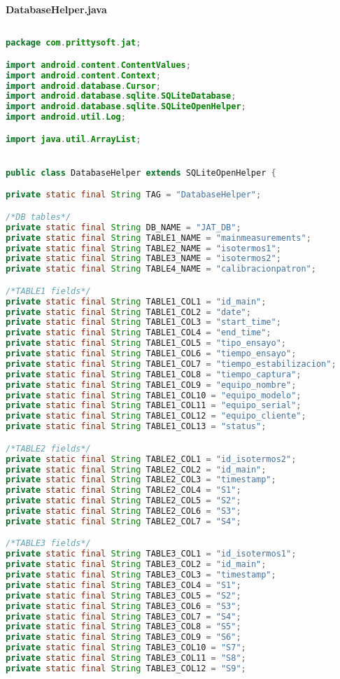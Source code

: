 \pagestyle{plain}
\centering\textbf{DatabaseHelper.java}

\begin{lstlisting}[language=java, caption={Clase DatabaseHelper, crea la base de datos de no existir y contiene las consultas e inserciones a la misma}, captionpos=b, basicstyle=\small]

package com.prittysoft.jat;

import android.content.ContentValues;
import android.content.Context;
import android.database.Cursor;
import android.database.sqlite.SQLiteDatabase;
import android.database.sqlite.SQLiteOpenHelper;
import android.util.Log;

import java.util.ArrayList;


public class DatabaseHelper extends SQLiteOpenHelper {

private static final String TAG = "DatabaseHelper";

/*DB tables*/
private static final String DB_NAME = "JAT_DB";
private static final String TABLE1_NAME = "mainmeasurements";
private static final String TABLE2_NAME = "isotermos1";
private static final String TABLE3_NAME = "isotermos2";
private static final String TABLE4_NAME = "calibracionpatron";

/*TABLE1 fields*/
private static final String TABLE1_COL1 = "id_main";
private static final String TABLE1_COL2 = "date";
private static final String TABLE1_COL3 = "start_time";
private static final String TABLE1_COL4 = "end_time";
private static final String TABLE1_COL5 = "tipo_ensayo";
private static final String TABLE1_COL6 = "tiempo_ensayo";
private static final String TABLE1_COL7 = "tiempo_estabilizacion";
private static final String TABLE1_COL8 = "tiempo_captura";
private static final String TABLE1_COL9 = "equipo_nombre";
private static final String TABLE1_COL10 = "equipo_modelo";
private static final String TABLE1_COL11 = "equipo_serial";
private static final String TABLE1_COL12 = "equipo_cliente";
private static final String TABLE1_COL13 = "status";

/*TABLE2 fields*/
private static final String TABLE2_COL1 = "id_isotermos2";
private static final String TABLE2_COL2 = "id_main";
private static final String TABLE2_COL3 = "timestamp";
private static final String TABLE2_COL4 = "S1";
private static final String TABLE2_COL5 = "S2";
private static final String TABLE2_COL6 = "S3";
private static final String TABLE2_COL7 = "S4";

/*TABLE3 fields*/
private static final String TABLE3_COL1 = "id_isotermos1";
private static final String TABLE3_COL2 = "id_main";
private static final String TABLE3_COL3 = "timestamp";
private static final String TABLE3_COL4 = "S1";
private static final String TABLE3_COL5 = "S2";
private static final String TABLE3_COL6 = "S3";
private static final String TABLE3_COL7 = "S4";
private static final String TABLE3_COL8 = "S5";
private static final String TABLE3_COL9 = "S6";
private static final String TABLE3_COL10 = "S7";
private static final String TABLE3_COL11 = "S8";
private static final String TABLE3_COL12 = "S9";


\end{lstlisting}
